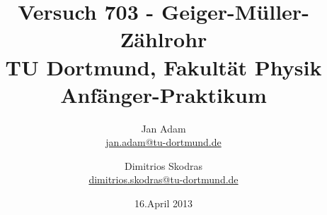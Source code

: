 



\title{Versuch 703 - Geiger-Müller-Zählrohr \\	%
\large TU Dortmund, Fakultät Physik\\
\normalsize Anfänger-Praktikum}

\author{Jan Adam\\	%
{\small \href{jan.adam@tu-dortmund.de}{jan.adam@tu-dortmund.de}}	%
\and	%
Dimitrios Skodras\\	%
{\small \href{dimitrios.skodras@tu-dortmund.de}{dimitrios.skodras@tu-dortmund.de}}	%
}
\date{16.April 2013}	%





\maketitle	%
\thispagestyle{empty} %



\tableofcontents


\newpage	%



